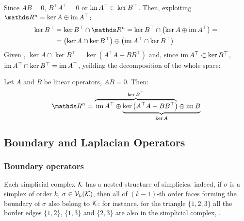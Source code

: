 Since \( A B = 0\), \( B^\top A^\top = 0 \) or \( \operatorname{im} A^\top \subset \ker B^\top \). Then, exploiting \( \ds R^n = \ker A \oplus \im A^\top \): 
\begin{equation}
      \begin{aligned}
            \ker B^\top & = \ker B^\top \cap \ds R^n = \ker B^\top \cap \left( \ker A \oplus \im A^\top \right) = \\
            & = \left( \ker A \cap \ker B^\top \right) \oplus \left( \im A^\top \cap \ker B^\top \right)
      \end{aligned}
\end{equation}
Given , \( \ker A \cap \ker B^\top = \ker \left(  A^\top A + B B^\top \right) \) and, since \( \operatorname{im} A^\top \subset \ker B^\top \), \( \operatorname{im} A^\top \cap \ker B^\top = \operatorname{im} A^\top \), yeilding the decomposition of  the whole space:
\begin{theorem}\label{thm:hodge_decomposition}
      Let \( A \) and \( B \) be linear operators, \( A B = 0 \). Then:
      \begin{equation}
            \ds R^n = \lefteqn{\overbrace{\phantom{\im A^\top \oplus  \ker \left( A^\top A + B B^\top \right)}}^{\ker B^\top}} \im A^\top \oplus
            \underbrace{\ker \left( A^\top A + B B^\top \right) \oplus  \im B}_{\ker A}
      \end{equation}
      \vspace{-\baselineskip}
\end{theorem}





\subsection{ Boundary and Laplacian Operators }

\subsubsection{Boundary operators}

Each simplicial complex \( \mathcal{K} \) has a nested structure of simplicies: indeed, if \( \sigma \) is a simplex of order \( k \), \( \sigma \in \mathcal{V}_{k}(\mathcal{K}) \), then all of \( (k-1)\)-th order faces forming the boundary of \( \sigma \) also belong to \( \mathcal{K} \): for instance, for the triangle \( \{ 1, 2, 3  \} \) all the border edges \( \{ 1, 2\} \), \( \{ 1, 3\}\) and \( \{ 2, 3 \}\) are also in the simplicial complex, . 

